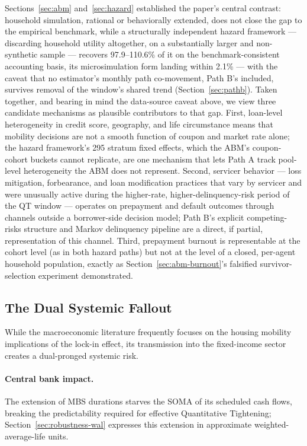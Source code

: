 \documentclass[12pt]{article}
\begin{document}
Sections~\ref{sec:abm} and~\ref{sec:hazard} established the paper's central contrast: household simulation, rational or behaviorally extended, does not close the gap to the empirical benchmark, while a structurally independent hazard framework --- discarding household utility altogether, on a substantially larger and non-synthetic sample --- recovers 97.9--110.6\% of it on the benchmark-consistent accounting basis, its microsimulation form landing within 2.1\% --- with the caveat that no estimator's monthly path co-movement, Path B's included, survives removal of the window's shared trend (Section~\ref{sec:pathb}). Taken together, and bearing in mind the data-source caveat above, we view three candidate mechanisms as plausible contributors to that gap. First, loan-level heterogeneity in credit score, geography, and life circumstance means that mobility decisions are not a smooth function of coupon and market rate alone; the hazard framework's 295 stratum fixed effects, which the ABM's coupon-cohort buckets cannot replicate, are one mechanism that lets Path A track pool-level heterogeneity the ABM does not represent. Second, servicer behavior --- loss mitigation, forbearance, and loan modification practices that vary by servicer and were unusually active during the higher-rate, higher-delinquency-risk period of the QT window --- operates on prepayment and default outcomes through channels outside a borrower-side decision model; Path B's explicit competing-risks structure and Markov delinquency pipeline are a direct, if partial, representation of this channel. Third, prepayment burnout is representable at the cohort level (as in both hazard paths) but not at the level of a closed, per-agent household population, exactly as Section~\ref{sec:abm-burnout}'s falsified survivor-selection experiment demonstrated.

\subsection{The Dual Systemic Fallout}\label{sec:discussion-fallout}

While the macroeconomic literature frequently focuses on the housing mobility implications of the lock-in effect, its transmission into the fixed-income sector creates a dual-pronged systemic risk.

\paragraph{Central bank impact.} The extension of MBS durations starves the SOMA of its scheduled cash flows, breaking the predictability required for effective Quantitative Tightening; Section~\ref{sec:robustness-wal} expresses this extension in approximate weighted-average-life units.
\end{document}
